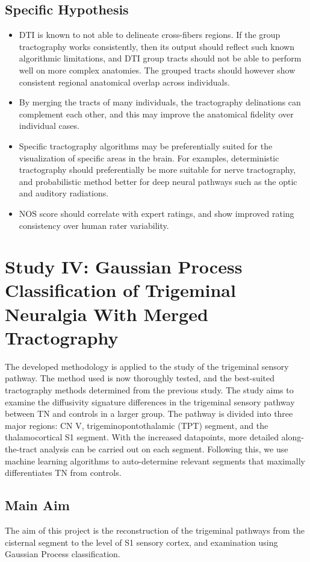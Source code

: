 \subsection{Specific Hypothesis}
\begin{itemize}
    \item DTI is known to not able to delineate cross-fibers regions. If the group tractography works consistently, then its output should reflect such known algorithmic limitations, and DTI group tracts should not be able to perform well on more complex anatomies. The grouped tracts should however show consistent regional anatomical overlap across individuals.
    \item By merging the tracts of many individuals, the tractography delinations can complement each other, and this may improve the anatomical fidelity over individual cases.
    \item Specific tractography algorithms may be preferentially suited for the visualization of specific areas in the brain. For examples, deterministic tractography should preferentially be more suitable for nerve tractography, and probabilistic method better for deep neural pathways such as the optic and auditory radiations.
    \item NOS score should correlate with expert ratings, and show improved rating consistency over human rater variability.
\end{itemize}

\section{Study IV: Gaussian Process Classification of Trigeminal Neuralgia With Merged Tractography}
The developed methodology is applied to the study of the trigeminal sensory pathway. The method used is now thoroughly tested, and the best-suited tractography methods determined from the previous study. The study aims to examine the diffusivity signature differences in the trigeminal sensory pathway between TN and controls in a larger group. The pathway is divided into three major regions: CN V, trigeminopontothalamic (TPT) segment, and the thalamocortical S1 segment. With the increased datapoints, more detailed along-the-tract analysis can be carried out on each segment. Following this, we use machine learning algorithms to auto-determine relevant segments that maximally differentiates TN from controls.

\subsection{Main Aim}
The aim of this project is the reconstruction of the trigeminal pathways from the cisternal segment to the level of S1 sensory cortex, and examination using Gaussian Process classification.


